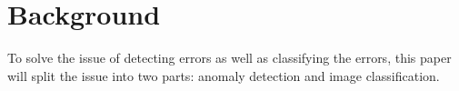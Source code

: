 \section{Background}

To solve the issue of detecting errors as well as classifying the errors, this paper will split the issue into two parts: anomaly detection and image classification. 





